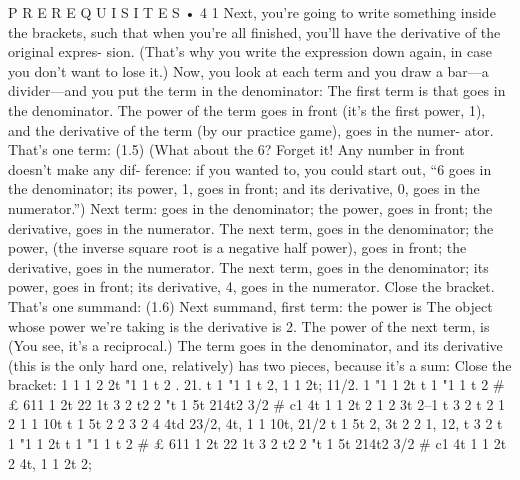 \documentclass[10pt,oneside]{article}
\begin{document}
P R E R E Q U I S I T E S • 4 1 Next, you’re going to write something inside the brackets, such that when you’re all finished, you’ll have the derivative of the original expres- sion. (That’s why you write the expression down again, in case you don’t want to lose it.) Now, you look at each term and you draw a bar---a divider---and you put the term in the denominator: The first term is that goes in the denominator. The power of the term goes in front (it’s the first power, 1), and the derivative of the term (by our practice game), goes in the numer- ator. That’s one term: (1.5) (What about the 6? Forget it! Any number in front doesn’t make any dif- ference: if you wanted to, you could start out, “6 goes in the denominator; its power, 1, goes in front; and its derivative, 0, goes in the numerator.”) Next term: goes in the denominator; the power, goes in front; the derivative, goes in the numerator. The next term, goes in the denominator; the power, (the inverse square root is a negative half power), goes in front; the derivative, goes in the numerator. The next term, goes in the denominator; its power, goes in front; its derivative, 4, goes in the numerator. Close the bracket. That’s one summand: (1.6) Next summand, first term: the power is The object whose power we’re taking is the derivative is 2. The power of the next term, is (You see, it’s a reciprocal.) The term goes in the denominator, and its derivative (this is the only hard one, relatively) has two pieces, because it’s a sum: Close the bracket: 1 1 1 2 2t "1 1 t 2 . 21. t 1 "1 1 t 2, 1 1 2t; 11/2. 1 "1 1 2t t 1 "1 1 t 2 \# £ 611 1 2t 22 1t 3 2 t2 2 "t 1 5t 214t2 3/2 \# c1 4t 1 1 2t 2 1 2 3t 2–1 t 3 2 t 2 1 2 1 1 10t t 1 5t 2 2 3 2 4 4td 23/2, 4t, 1 1 10t, 21/2 t 1 5t 2, 3t 2 2 1, 12, t 3 2 t 1 "1 1 2t t 1 "1 1 t 2 \# £ 611 1 2t 22 1t 3 2 t2 2 "t 1 5t 214t2 3/2 \# c1 4t 1 1 2t 2 4t, 1 1 2t 2;\par
\end{document}
